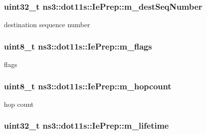 \subsubsection[{\texorpdfstring{m\+\_\+dest\+Seq\+Number}{m_destSeqNumber}}]{\setlength{\rightskip}{0pt plus 5cm}uint32\+\_\+t ns3\+::dot11s\+::\+Ie\+Prep\+::m\+\_\+dest\+Seq\+Number\hspace{0.3cm}{\ttfamily [private]}}\hypertarget{classns3_1_1dot11s_1_1IePrep_a306e7580a4bdf560795e8f2b9fc212c4}{}\label{classns3_1_1dot11s_1_1IePrep_a306e7580a4bdf560795e8f2b9fc212c4}


destination sequence number 

\subsubsection[{\texorpdfstring{m\+\_\+flags}{m_flags}}]{\setlength{\rightskip}{0pt plus 5cm}uint8\+\_\+t ns3\+::dot11s\+::\+Ie\+Prep\+::m\+\_\+flags\hspace{0.3cm}{\ttfamily [private]}}\hypertarget{classns3_1_1dot11s_1_1IePrep_a08307bdb02afd2d83937ba7429019f48}{}\label{classns3_1_1dot11s_1_1IePrep_a08307bdb02afd2d83937ba7429019f48}


flags 

\subsubsection[{\texorpdfstring{m\+\_\+hopcount}{m_hopcount}}]{\setlength{\rightskip}{0pt plus 5cm}uint8\+\_\+t ns3\+::dot11s\+::\+Ie\+Prep\+::m\+\_\+hopcount\hspace{0.3cm}{\ttfamily [private]}}\hypertarget{classns3_1_1dot11s_1_1IePrep_a5910fa07cbb84c93c5a6825eff3d355d}{}\label{classns3_1_1dot11s_1_1IePrep_a5910fa07cbb84c93c5a6825eff3d355d}


hop count 

\subsubsection[{\texorpdfstring{m\+\_\+lifetime}{m_lifetime}}]{\setlength{\rightskip}{0pt plus 5cm}uint32\+\_\+t ns3\+::dot11s\+::\+Ie\+Prep\+::m\+\_\+lifetime\hspace{0.3cm}{\ttfamily [private]}}\hypertarget{classns3_1_1dot11s_1_1IePrep_a143a676cf4e49eba8017466fa665eb49}{}\label{classns3_1_1dot11s_1_1IePrep_a143a676cf4e49eba8017466fa665eb49}



